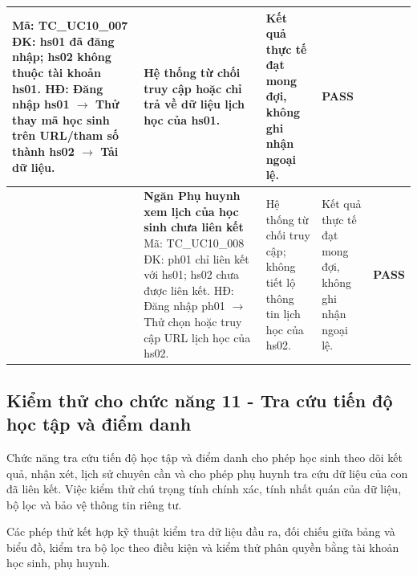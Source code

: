 \begin{longtable}{|>{\centering\arraybackslash}p{0.8cm}|>{\raggedright\arraybackslash}p{4.6cm}|>{\raggedright\arraybackslash}p{3.8cm}|>{\raggedright\arraybackslash}p{3.8cm}|>{\centering\arraybackslash}p{1.5cm}|}
Mã: TC\_UC10\_007\newline
ĐK: hs01 đã đăng nhập; hs02 không thuộc tài khoản hs01.\newline
HĐ: Đăng nhập hs01 $\rightarrow$ Thử thay mã học sinh trên URL/tham số thành hs02 $\rightarrow$ Tải dữ liệu. &
Hệ thống từ chối truy cập hoặc chỉ trả về dữ liệu lịch học của hs01. &
Kết quả thực tế đạt mong đợi, không ghi nhận ngoại lệ. & \textbf{PASS} \\
\hline
8 & \textbf{Ngăn Phụ huynh xem lịch của học sinh chưa liên kết}\newline
Mã: TC\_UC10\_008\newline
ĐK: ph01 chỉ liên kết với hs01; hs02 chưa được liên kết.\newline
HĐ: Đăng nhập ph01 $\rightarrow$ Thử chọn hoặc truy cập URL lịch học của hs02. &
Hệ thống từ chối truy cập; không tiết lộ thông tin lịch học của hs02. &
Kết quả thực tế đạt mong đợi, không ghi nhận ngoại lệ. & \textbf{PASS} \\
\hline
\end{longtable}

\vspace{0.8em}
\subsection{Kiểm thử cho chức năng 11 - Tra cứu tiến độ học tập và điểm danh}
Chức năng tra cứu tiến độ học tập và điểm danh cho phép học sinh theo dõi kết quả, nhận xét, lịch sử chuyên cần và cho phép phụ huynh tra cứu dữ liệu của con đã liên kết. Việc kiểm thử chú trọng tính chính xác, tính nhất quán của dữ liệu, bộ lọc và bảo vệ thông tin riêng tư.

Các phép thử kết hợp kỹ thuật kiểm tra dữ liệu đầu ra, đối chiếu giữa bảng và biểu đồ, kiểm tra bộ lọc theo điều kiện và kiểm thử phân quyền bằng tài khoản học sinh, phụ huynh.


